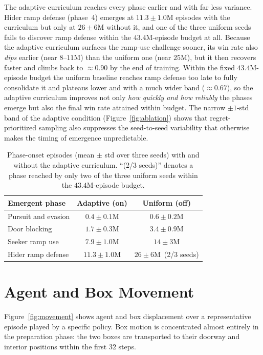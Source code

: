 \documentclass{article}
\begin{document}
The adaptive curriculum reaches every phase earlier and with far less variance.
Hider ramp defense (phase~4) emerges at $11.3\pm1.0$M episodes with the curriculum
but only at $26\pm6$M without it, and one of the three uniform seeds fails to
discover ramp defense within the $43.4$M-episode budget at all. Because the
adaptive curriculum surfaces the ramp-use challenge sooner, its win rate also
\emph{dips} earlier (near $8$--$11$M) than the uniform one (near $25$M), but it then
recovers faster and climbs back to $\approx0.90$ by the end of training. Within the
fixed $43.4$M-episode budget the uniform baseline reaches ramp defense too late to
fully consolidate it and plateaus lower and with a much wider band
($\approx0.67$), so the adaptive curriculum improves not only \emph{how quickly and
how reliably} the phases emerge but also the final win rate attained within budget.
The narrow $\pm1$-std band of the adaptive condition
(Figure~\ref{fig:ablation}) shows that regret-prioritized sampling also suppresses
the seed-to-seed variability that otherwise makes the timing of emergence
unpredictable.

\begin{table}[H]
  \centering
  \caption{Phase-onset episodes (mean $\pm$ std over three seeds) with and without
  the adaptive curriculum. ``(2/3 seeds)'' denotes a phase reached
  by only two of the three uniform seeds within the $43.4$M-episode budget.}
  \label{tab:ablation}
  \begin{tabular}{lcc}
    \toprule
    Emergent phase & Adaptive (on) & Uniform (off) \\
    \midrule
    Pursuit and evasion & $0.4\pm0.1$M  & $0.6\pm0.2$M \\
    Door blocking       & $1.7\pm0.3$M  & $3.4\pm0.9$M \\
    Seeker ramp use     & $7.9\pm1.0$M  & $14\pm3$M \\
    Hider ramp defense  & $11.3\pm1.0$M & $26\pm6$M~(2/3 seeds) \\
    \bottomrule
  \end{tabular}
\end{table}

\newpage
\section{Agent and Box Movement}
\label{app:movement}
Figure~\ref{fig:movement} shows agent and box displacement over a representative
episode played by a specific policy. Box motion is concentrated almost entirely in
the preparation phase: the two boxes are transported to their doorway and interior
positions within the first 32 steps.
\end{document}
